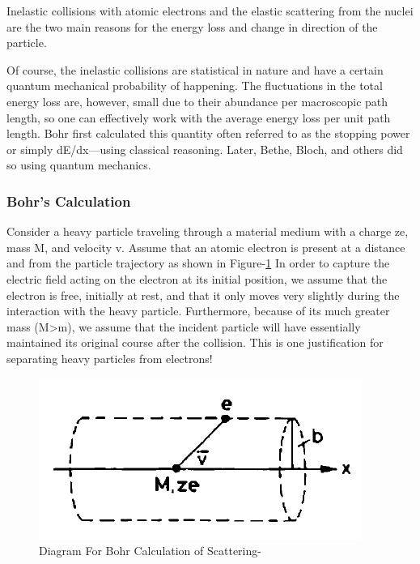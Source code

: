 \documentclass{article}
\begin{document}
\begin{multicols}{2}
Inelastic collisions with atomic electrons and the elastic scattering from the nuclei
are the two main reasons for the energy loss and change in direction of the particle.

Of course, the inelastic collisions are statistical in nature and have a 
certain quantum mechanical probability of happening. The fluctuations in 
the total energy loss are, however, small due to their abundance per 
macroscopic path length, so one can effectively work with the average 
energy loss per unit path length. Bohr first calculated this quantity 
often referred to as the stopping power or simply dE/dx—using classical 
reasoning. Later, Bethe, Bloch, and others did so using quantum mechanics.


\subsubsection{Bohr's Calculation}

Consider a heavy particle traveling through a material medium with a 
charge ze, mass M, and velocity v. Assume that an atomic electron is 
present at a distance and from the particle trajectory as shown in 
Figure-\ref{bohrsct1} 
In order to capture the electric field acting 
on the electron at its initial position, we assume that the electron 
is free, initially at rest, and that it only moves very slightly during 
the interaction with the heavy particle. Furthermore, because of its much 
greater mass (M>m), we assume that the incident particle will have 
essentially maintained its original course after the collision. 
This is one justification for separating heavy particles from electrons!




\begin{figure}[H]
    \centering	
     \includegraphics[width=\columnwidth]{bohrsct.png}
     \caption{Diagram For Bohr Calculation of Scattering-\cite{leo1988techniques}}
     \label{bohrsct1}
\end{figure}



\end{multicols}
\end{document}
